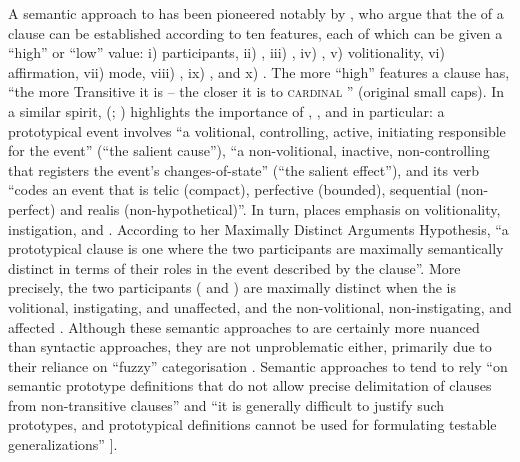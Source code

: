 A semantic approach to  has been pioneered notably by \citet[253]{hopper:thompson:1980}, who argue that the  of a clause can be established according to ten features, each of which can be given a “high” or “low” value: i) participants, ii) , iii) , iv) , v) volitionality, vi) affirmation, vii) mode, viii) , ix) , and x) . The more “high” features a clause has, “the more Transitive it is – the closer it is to \textsc{cardinal} ” (original small caps). In a similar spirit, \citeauthor{givon:2001a} (\citeyear[209]{givon:2001a}; \citeyear[93]{givon:2001b}) highlights the importance of , , and  in particular: a prototypical  event involves “a volitional, controlling, active, initiating  responsible for the event” (“the salient cause”), “a non-volitional, inactive, non-controlling  that registers the event’s changes-of-state” (“the salient effect”), and its verb “codes an event that is telic (compact), perfective (bounded), sequential (non-perfect) and realis (non-hypothetical)”. In turn, \citet[30]{nass:2007} places emphasis on volitionality, instigation, and . According to her Maximally Distinct Arguments Hypothesis, “a prototypical  clause is one where the two participants are maximally semantically distinct in terms of their roles in the event described by the clause”. More precisely, the two participants ( and ) are maximally distinct when the  is volitional, instigating, and unaffected, and the  non-volitional, non-instigating, and affected \citep[44]{nass:2007}. Although these semantic approaches to  are certainly more nuanced than syntactic approaches, they are not unproblematic either, primarily due to their reliance on “fuzzy” categorisation \citep{geeraerts:1989}. Semantic approaches to  tend to rely “on semantic prototype definitions that do not allow precise delimitation of  clauses from non-transitive clauses” \citep[544]{haspelmath:2011a} and “it is generally difficult to justify such prototypes, and prototypical definitions cannot be used for formulating testable generalizations” \citep[313]{haspelmath:2016b}].
 
